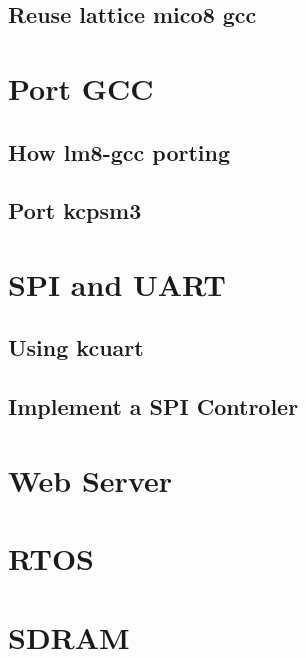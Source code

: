 \documentclass[a4paper]{book}
\begin{document}
\begin{CJK*}{UTF8}{song}
\chapter{Reuse lattice mico8 gcc}

\part{Port GCC}

\chapter{How lm8-gcc porting}
\chapter{Port kcpsm3}

\part{SPI and UART}
\chapter{Using kcuart}
\chapter{Implement a SPI Controler}

\part{Web Server}

\part{RTOS}

\part{SDRAM}


\end{CJK*} 
\end{document}
